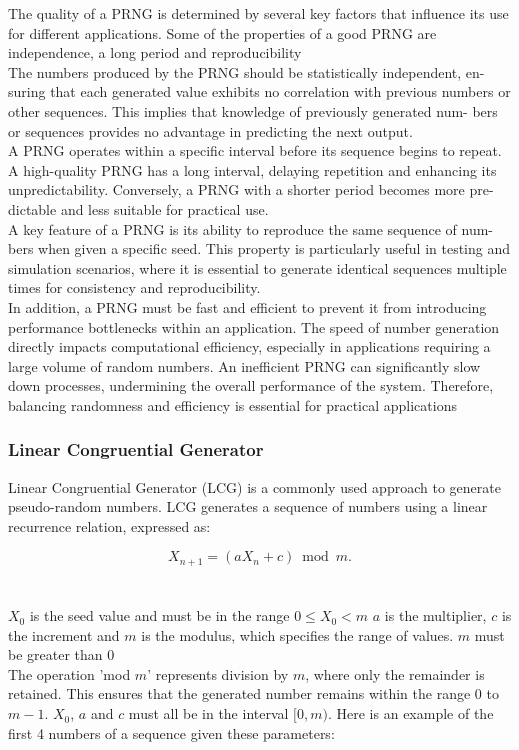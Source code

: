 The quality of a PRNG is determined by several key factors that influence its
use for different applications. Some of the properties of a good PRNG are independence, a long period and reproducibility
\newline \\
The numbers produced by the PRNG should be statistically independent, en-
suring that each generated value exhibits no correlation with previous numbers
or other sequences. This implies that knowledge of previously generated num-
bers or sequences provides no advantage in predicting the next output.
\newline \\
A PRNG operates within a specific interval before its sequence begins to repeat.
A high-quality PRNG has a long interval, delaying repetition and enhancing its
unpredictability. Conversely, a PRNG with a shorter period becomes more pre-
dictable and less suitable for practical use.
\newline \\
A key feature of a PRNG is its ability to reproduce the same sequence of num-
bers when given a specific seed. This property is particularly useful in testing
and simulation scenarios, where it is essential to generate identical sequences
multiple times for consistency and reproducibility.
\newline \\
In addition, a PRNG must be fast and efficient to prevent it from introducing
performance bottlenecks within an application. The speed of number generation
directly impacts computational efficiency, especially in applications requiring a
large volume of random numbers. An inefficient PRNG can significantly slow
down processes, undermining the overall performance of the system. Therefore,
balancing randomness and efficiency is essential for practical applications

\subsubsection{Linear Congruential Generator}

Linear Congruential Generator (LCG) is a commonly used approach to generate
pseudo-random numbers. LCG generates a sequence of numbers using a linear
recurrence relation, expressed as:

$$X_{n+1} = (aX_n + c) \bmod m.$$  \\
\\
\noindent $X_0$ is the seed value and must be in the range $0 \leq X_0 < m$ \newline
$a$ is the multiplier,\newline 
$c$ is the increment and \newline
$m$ is the modulus, which specifies the range of values. $m$ must be greater than 0 \newline
\\
\noindent The operation 'mod $m$' represents division by $m$, where only the remainder
is retained. This ensures that the generated number remains within the range
0 to $m-1$.  $X_0$, $a$ and $c$ must all be in the interval $[0, m)$. 
Here is an example of the first 4 numbers of a sequence given these parameters: \newline

